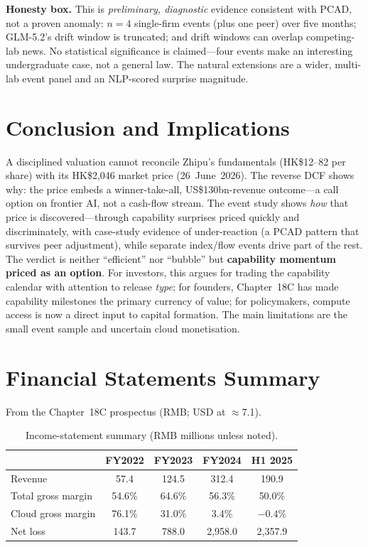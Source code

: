 \documentclass[11pt]{article}
\begin{document}
\textbf{Honesty box.} This is \emph{preliminary, diagnostic} evidence consistent with PCAD, not a proven
anomaly: $n=4$ single-firm events (plus one peer) over five months; GLM-5.2's drift window is truncated; and
drift windows can overlap competing-lab news. No statistical significance
is claimed---four events make an interesting undergraduate case, not a general law. The natural extensions
are a wider, multi-lab event panel and an NLP-scored surprise magnitude.

\section{Conclusion and Implications}
\enlargethispage{3\baselineskip}%
A disciplined valuation cannot reconcile Zhipu's fundamentals (HK\$12--82 per share) with its HK\$2,046
market price (26~June~2026). The reverse DCF shows why: the price embeds a winner-take-all, US\$130bn-revenue
outcome---a call option on frontier AI, not a cash-flow stream. The event study shows
\emph{how} that price is discovered---through capability surprises priced quickly and discriminately, with
case-study evidence of under-reaction (a PCAD pattern that survives peer adjustment), while separate index/flow events
drive part of the rest. The verdict is neither ``efficient'' nor ``bubble'' but \textbf{capability momentum
priced as an option}. For investors, this argues for trading the capability calendar with attention to release
\emph{type}; for founders, Chapter~18C has made capability milestones the primary currency of value; for
policymakers, compute access is now a direct input to capital formation. The main limitations are the small
event sample and uncertain cloud monetisation.

\appendix
\clearpage
\section{Financial Statements Summary}
\label{sec:statements}
From the Chapter~18C prospectus (RMB; USD at $\approx$7.1).

\begin{table}[H]
\centering
\caption{Income-statement summary (RMB millions unless noted).}
\begin{tabular}{lcccc}
\toprule
 & FY2022 & FY2023 & FY2024 & H1 2025 \\
\midrule
Revenue & 57.4 & 124.5 & 312.4 & 190.9 \\
Total gross margin & 54.6\% & 64.6\% & 56.3\% & 50.0\% \\
Cloud gross margin & 76.1\% & 31.0\% & 3.4\% & $-0.4\%$ \\
Net loss & 143.7 & 788.0 & 2{,}958.0 & 2{,}357.9 \\
\bottomrule
\end{tabular}
\end{table}
\end{document}
